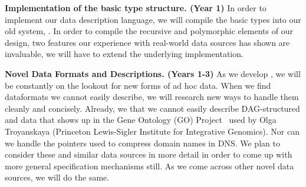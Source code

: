 \documentclass[11pt]{article}
\begin{document}

\noindent
{\bf Implementation of the basic type structure. (Year 1)}
In order to implement our data description language,
we will compile the basic types into our old system, \pads.
In order to compile the recursive and polymorphic
elements of our design, 
two features our experience with real-world data sources
has shown are invaluable,
we will have to extend the underlying \pads{}
implementation.  


\noindent
{\bf Novel Data Formats and Descriptions. (Years 1-3)}
As we develop \datatype, we will be constantly
on the lookout for new forms of ad hoc data.  
When we find dataformats we cannot easily describe,
we will research new ways to handle them cleanly and concisely.
Already, we that we cannot easily describe DAG-structured
and data that shows up in the Gene Ontology (GO)
Project~\cite{geneontology} used by Olga
Troyanskaya (Princeton Lewis-Sigler Institute for Integrative
Genomics).  Nor can we handle the pointers used to compress
domain names in DNS.
We plan to consider these and similar data sources in more detail
in order to come up with more general specification mechanisms still.
As we come across other novel data sources, we will do the same.
\end{document}
